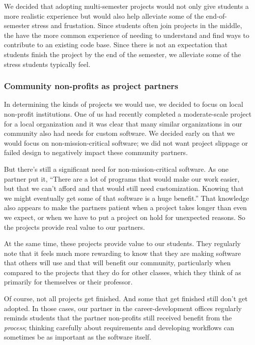 We decided that adopting multi-semester projects would not only
give students a more realistic experience but would also help
alleviate some of the end-of-semester stress and frustation.  Since
students often join projects in the middle, the have the more common
experience of needing to understand and find ways to contribute to
an existing code base.  Since there is not an expectation that
students finish the project by the end of the semester, we alleviate
some of the stress students typically feel.

\subsubsection{Community non-profits as project partners}

In determining the kinds of projects we would use, we decided to
focus on local non-profit institutions.  One of us had recently
completed a moderate-scale project for a local organization and it
was clear that many similar organizations in our community also had
needs for custom software.  We decided early on that we would focus
on non-mission-critical software; we did not want project slippage
or failed design to negatively impact these community partners.

But there's still a significant need for non-mission-critical software.
As one partner put it, ``There are a lot of programs that would make
our work easier, but that we can't afford and that would still need
customization.  Knowing that we might eventually get some of that
software is a huge benefit.''  That knowledge also appears to make the
partners patient when a project takes longer than even we expect, or
when we have to put a project on hold for unexpected reasons. So the
projects provide real value to our partners.

At the same time, these projects provide value to our students.  They
regularly note that it feels much more rewarding to know that they are
making software that others will use and that will benefit our community,
particularly when compared to the projects that they do for other classes,
which they think of as primarily for themselves or their professor.

Of course, not all projects get finished.  And some that get finished
still don't get adopted.  In those cases, our partner in the 
career-development offices regularly reminds students that the
partner non-profits still received benefit from the \textit{process};
thinking carefully about requirements and developing workflows can
sometimes be as important as the software itself.

